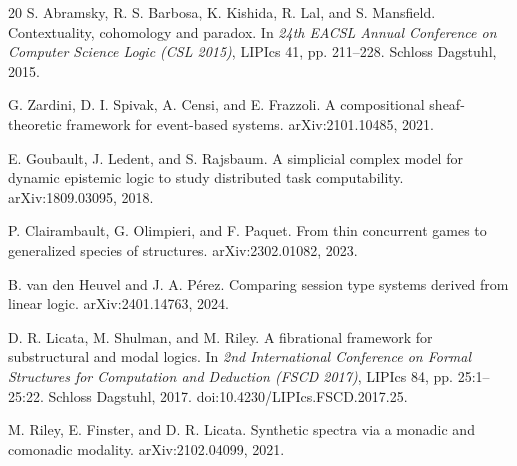 \documentclass[11pt]{article}
\begin{document}
\begin{thebibliography}{20}
S. Abramsky, R. S. Barbosa, K. Kishida, R. Lal, and S. Mansfield.
Contextuality, cohomology and paradox.
In \emph{24th EACSL Annual Conference on Computer Science Logic (CSL 2015)},
LIPIcs 41, pp. 211--228. Schloss Dagstuhl, 2015.

G. Zardini, D. I. Spivak, A. Censi, and E. Frazzoli.
A compositional sheaf-theoretic framework for event-based systems.
arXiv:2101.10485, 2021.

E. Goubault, J. Ledent, and S. Rajsbaum.
A simplicial complex model for dynamic epistemic logic to study distributed task
computability.
arXiv:1809.03095, 2018.

P. Clairambault, G. Olimpieri, and F. Paquet.
From thin concurrent games to generalized species of structures.
arXiv:2302.01082, 2023.

B. van den Heuvel and J. A. P\'erez.
Comparing session type systems derived from linear logic.
arXiv:2401.14763, 2024.

D. R. Licata, M. Shulman, and M. Riley.
A fibrational framework for substructural and modal logics.
In \emph{2nd International Conference on Formal Structures for Computation and
Deduction (FSCD 2017)}, LIPIcs 84, pp. 25:1--25:22. Schloss Dagstuhl, 2017.
doi:10.4230/LIPIcs.FSCD.2017.25.

M. Riley, E. Finster, and D. R. Licata.
Synthetic spectra via a monadic and comonadic modality.
arXiv:2102.04099, 2021.

\end{thebibliography}
\end{document}
